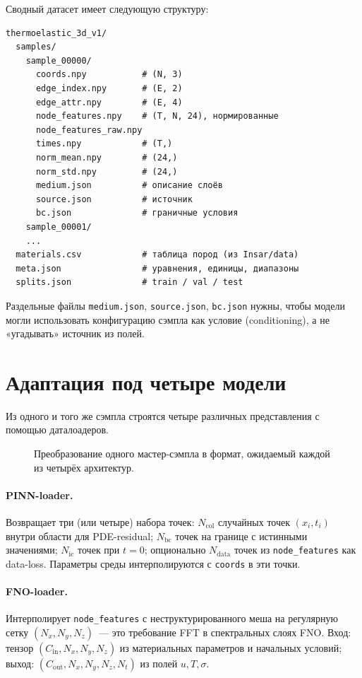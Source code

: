 \documentclass[12pt]{article}
\begin{document}
Сводный датасет имеет следующую структуру:
\begin{verbatim}
thermoelastic_3d_v1/
  samples/
    sample_00000/
      coords.npy           # (N, 3)
      edge_index.npy       # (E, 2)
      edge_attr.npy        # (E, 4)
      node_features.npy    # (T, N, 24), нормированные
      node_features_raw.npy
      times.npy            # (T,)
      norm_mean.npy        # (24,)
      norm_std.npy         # (24,)
      medium.json          # описание слоёв
      source.json          # источник
      bc.json              # граничные условия
    sample_00001/
    ...
  materials.csv            # таблица пород (из Insar/data)
  meta.json                # уравнения, единицы, диапазоны
  splits.json              # train / val / test
\end{verbatim}

Раздельные файлы \texttt{medium.json}, \texttt{source.json},
\texttt{bc.json} нужны, чтобы модели могли использовать конфигурацию
сэмпла как условие (conditioning), а не «угадывать» источник из полей.

\section{Адаптация под четыре модели}

Из одного и того же сэмпла строятся четыре различных представления
с помощью даталоадеров.

\begin{figure}[h]
\centering

\caption{Преобразование одного мастер-сэмпла в формат, ожидаемый каждой из
четырёх архитектур.}
\label{fig:loaders}
\end{figure}

\paragraph{PINN-loader.} Возвращает три (или четыре) набора точек:
$N_{\mathrm{col}}$ случайных точек $(x_i, t_i)$ внутри области
для PDE-residual; $N_{\mathrm{bc}}$ точек на границе с истинными значениями;
$N_{\mathrm{ic}}$ точек при $t=0$; опционально $N_{\mathrm{data}}$ точек
из \texttt{node\_features} как data-loss. Параметры среды интерполируются
с \texttt{coords} в эти точки.

\paragraph{FNO-loader.} Интерполирует \texttt{node\_features} с
неструктурированного меша на регулярную сетку
$(N_x, N_y, N_z)$~--- это требование FFT в спектральных слоях FNO.
Вход: тензор $(C_{\mathrm{in}}, N_x, N_y, N_z)$ из материальных параметров
и начальных условий; выход: $(C_{\mathrm{out}}, N_x, N_y, N_z, N_t)$
из полей $u, T, \sigma$.
\end{document}
